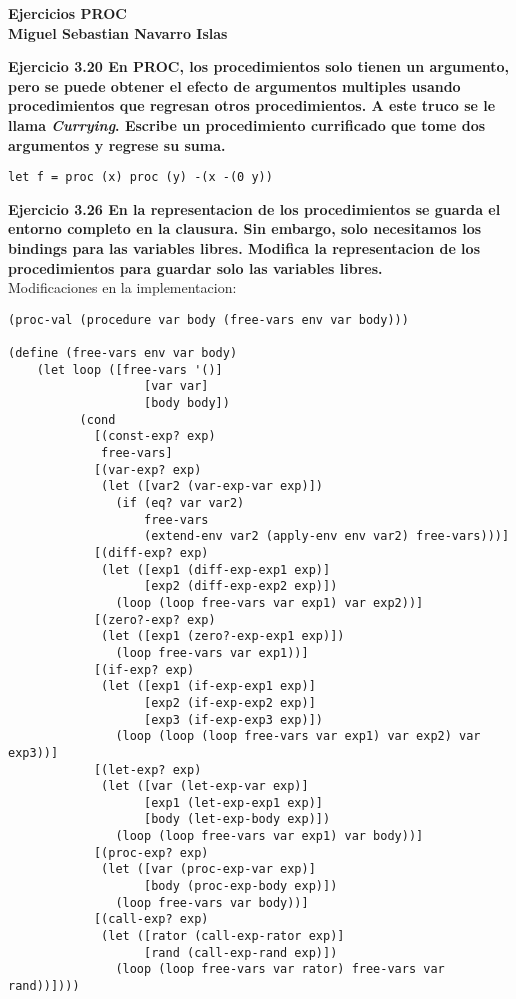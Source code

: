 \documentclass[a4paper]{article}
\begin{document}

	\begin{center}
		\large \textbf{Ejercicios PROC \\ Miguel Sebastian Navarro Islas}
	\end{center}
\textbf{Ejercicio 3.20 En PROC, los procedimientos solo tienen un argumento, pero se puede obtener el efecto de argumentos multiples usando procedimientos que regresan otros procedimientos. A este truco se le llama \textit{Currying}. Escribe un procedimiento currificado que tome dos argumentos y regrese su suma.}
\begin{lstlisting}
let f = proc (x) proc (y) -(x -(0 y))
\end{lstlisting}
\textbf{Ejercicio 3.26 En la representacion de los procedimientos se guarda el entorno completo en la clausura. Sin embargo, solo necesitamos los bindings para las variables libres. Modifica la representacion de los procedimientos para guardar solo las variables libres.}\\
Modificaciones en la implementacion:
\begin{lstlisting}
(proc-val (procedure var body (free-vars env var body)))

(define (free-vars env var body)
	(let loop ([free-vars '()]
                   [var var]
                   [body body])
          (cond
            [(const-exp? exp)
             free-vars]
            [(var-exp? exp)
             (let ([var2 (var-exp-var exp)])
               (if (eq? var var2)
                   free-vars
                   (extend-env var2 (apply-env env var2) free-vars)))]
            [(diff-exp? exp)
             (let ([exp1 (diff-exp-exp1 exp)]
                   [exp2 (diff-exp-exp2 exp)])
               (loop (loop free-vars var exp1) var exp2))]
            [(zero?-exp? exp)
             (let ([exp1 (zero?-exp-exp1 exp)])
               (loop free-vars var exp1))]
            [(if-exp? exp)
             (let ([exp1 (if-exp-exp1 exp)]
                   [exp2 (if-exp-exp2 exp)]
                   [exp3 (if-exp-exp3 exp)])
               (loop (loop (loop free-vars var exp1) var exp2) var exp3))]
            [(let-exp? exp)
             (let ([var (let-exp-var exp)]
                   [exp1 (let-exp-exp1 exp)]
                   [body (let-exp-body exp)])
               (loop (loop free-vars var exp1) var body))]
            [(proc-exp? exp)
             (let ([var (proc-exp-var exp)]
                   [body (proc-exp-body exp)])
               (loop free-vars var body))]
            [(call-exp? exp)
             (let ([rator (call-exp-rator exp)]
                   [rand (call-exp-rand exp)])
               (loop (loop free-vars var rator) free-vars var rand))])))
\end{lstlisting}
\end{document}

